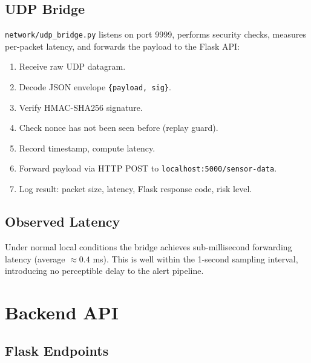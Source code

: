 \documentclass[12pt, a4paper]{article}
\begin{document}
\subsection{UDP Bridge}

\texttt{network/udp\_bridge.py} listens on port 9999, performs security checks,
measures per-packet latency, and forwards the payload to the Flask API:

\begin{enumerate}
    \item Receive raw UDP datagram.
    \item Decode JSON envelope \texttt{\{payload, sig\}}.
    \item Verify HMAC-SHA256 signature.
    \item Check nonce has not been seen before (replay guard).
    \item Record timestamp, compute latency.
    \item Forward payload via HTTP POST to \texttt{localhost:5000/sensor-data}.
    \item Log result: packet size, latency, Flask response code, risk level.
\end{enumerate}

\subsection{Observed Latency}

Under normal local conditions the bridge achieves sub-millisecond forwarding
latency (average $\approx 0.4$ ms). This is well within the 1-second sampling
interval, introducing no perceptible delay to the alert pipeline.

\section{Backend API}
\label{sec:api}

\subsection{Flask Endpoints}
\end{document}
